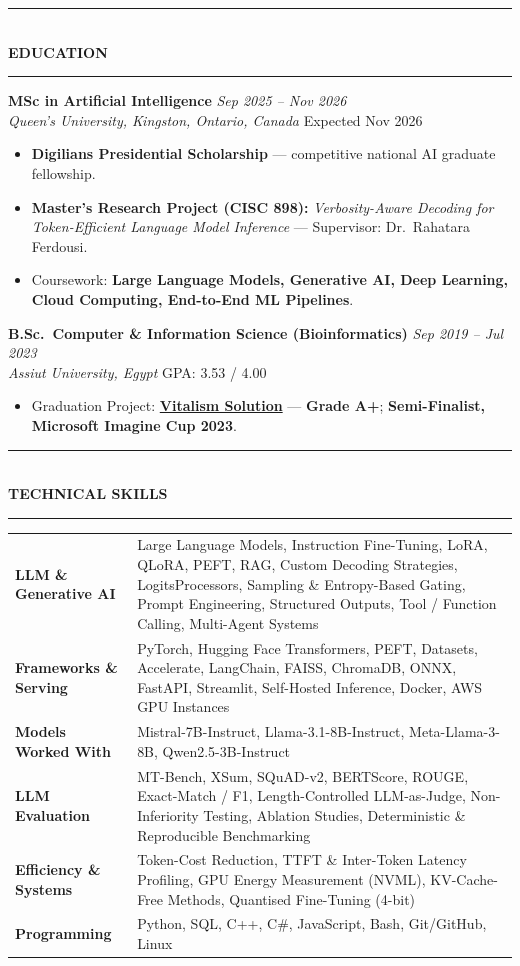 \documentclass[10pt, a4paper]{article}
\newcommand{\cvsection}[1]{%
  \vspace{3pt}%
  {\color{navy}\rule{\linewidth}{1.1pt}}\\[0.5pt]%
  {\color{navy}\bfseries\fontsize{9.5}{11}\selectfont\uppercase{#1}}\\[-4pt]%
  {\color{teal}\rule{\linewidth}{0.6pt}}%
  \vspace{2pt}%
}
\newcommand{\cventry}[4]{%
  \vspace{2.5pt}%
  \textbf{\color{darkgray}#1} \hfill {\color{midgray}\textit{#3}}\\[-1.5pt]%
  {\color{teal}\textit{#2}} \hfill {\color{midgray}#4}%
}
\newenvironment{cvitems}{%
  \begin{itemize}[leftmargin=11pt, itemsep=0.5pt, parsep=0pt, topsep=1pt,
                  label={\textcolor{teal}{$\bullet$}}]
}{%
  \end{itemize}%
}
\begin{document}
\cvsection{Education}

\cventry{MSc in Artificial Intelligence}{Queen's University, Kingston, Ontario, Canada}
        {Sep 2025 -- Nov 2026}{Expected Nov 2026}
\begin{cvitems}
  \item \textbf{Digilians Presidential Scholarship} --- competitive national AI graduate fellowship.
  \item \textbf{Master's Research Project (CISC 898):} \textit{Verbosity-Aware Decoding for Token-Efficient Language Model Inference} --- Supervisor: Dr.\ Rahatara Ferdousi.
  \item Coursework: \textbf{Large Language Models, Generative AI, Deep Learning, Cloud Computing, End-to-End ML Pipelines}.
\end{cvitems}

\cventry{B.Sc.\ Computer \& Information Science (Bioinformatics)}{Assiut University, Egypt}
        {Sep 2019 -- Jul 2023}{GPA: 3.53 / 4.00}
\begin{cvitems}
  \item Graduation Project: \href{https://vitalismsolution.github.io/}{\textbf{Vitalism Solution}} --- \textbf{Grade A+}; \textbf{Semi-Finalist, Microsoft Imagine Cup 2023}.
\end{cvitems}

\cvsection{Technical Skills}

\renewcommand{\arraystretch}{1.1}
\begin{tabularx}{\linewidth}{@{}>{\raggedright\hyphenpenalty=10000\arraybackslash}p{35mm} X@{}}
\textbf{LLM \& Generative AI} &
Large Language Models, Instruction Fine-Tuning, LoRA, QLoRA, PEFT, RAG, Custom Decoding Strategies, LogitsProcessors, Sampling \& Entropy-Based Gating, Prompt Engineering, Structured Outputs, Tool / Function Calling, Multi-Agent Systems \\

\textbf{Frameworks \& Serving} &
PyTorch, Hugging Face Transformers, PEFT, Datasets, Accelerate, LangChain, FAISS, ChromaDB, ONNX, FastAPI, Streamlit, Self-Hosted Inference, Docker, AWS GPU Instances \\

\textbf{Models Worked With} &
Mistral-7B-Instruct, Llama-3.1-8B-Instruct, Meta-Llama-3-8B, Qwen2.5-3B-Instruct \\

\textbf{LLM Evaluation} &
MT-Bench, XSum, SQuAD-v2, BERTScore, ROUGE, Exact-Match / F1, Length-Controlled LLM-as-Judge, Non-Inferiority Testing, Ablation Studies, Deterministic \& Reproducible Benchmarking \\

\textbf{Efficiency \& Systems} &
Token-Cost Reduction, TTFT \& Inter-Token Latency Profiling, GPU Energy Measurement (NVML), KV-Cache-Free Methods, Quantised Fine-Tuning (4-bit) \\

\textbf{Programming} &
Python, SQL, C++, C\#, JavaScript, Bash, Git/GitHub, Linux \\
\end{tabularx}
\end{document}
